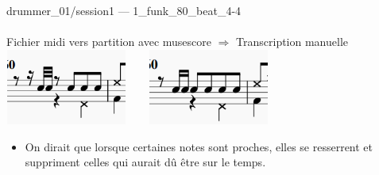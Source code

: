 drummer\_01/session1 — 1\_funk\_80\_beat\_4-4\\\\
Fichier midi vers partition avec musescore $\Rightarrow$ Transcription manuelle\\
\includegraphics[height=25mm, width=40mm]{z_images/transcriptions_manuelles/0_prise_en_main/1_drummer_01__session1/musescore_0.png}\ \ \ \ 
\includegraphics[height=25mm, width=40mm]{z_images/transcriptions_manuelles/0_prise_en_main/1_drummer_01__session1/Manuelle_0.png}
\begin{itemize}
	\item On dirait que lorsque certaines notes sont proches, elles se resserrent et suppriment celles qui aurait dû être sur le temps.\\
\end{itemize}
